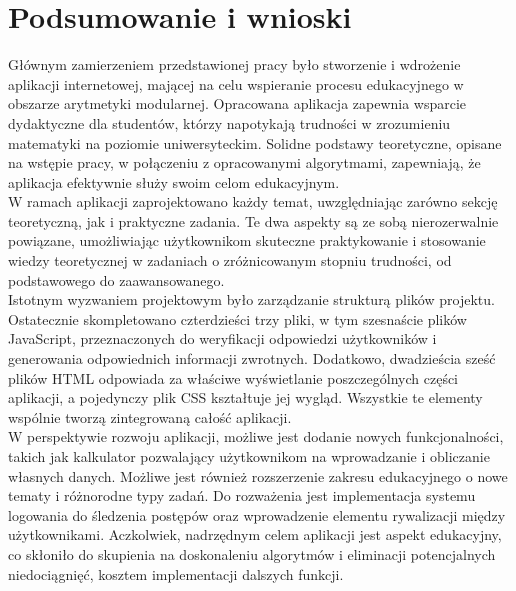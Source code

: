 \documentclass{SGGW-thesis}
\begin{document}
	\chapter{Podsumowanie i wnioski}
	Głównym zamierzeniem przedstawionej pracy było stworzenie i wdrożenie aplikacji internetowej, mającej na celu wspieranie procesu edukacyjnego w obszarze arytmetyki modularnej. Opracowana aplikacja zapewnia wsparcie dydaktyczne dla studentów, którzy napotykają trudności w zrozumieniu matematyki na poziomie uniwersyteckim. Solidne podstawy teoretyczne, opisane na wstępie pracy, w połączeniu z opracowanymi algorytmami, zapewniają, że aplikacja efektywnie służy swoim celom edukacyjnym.
	\\
	W ramach aplikacji zaprojektowano każdy temat, uwzględniając zarówno sekcję teoretyczną, jak i praktyczne zadania. Te dwa aspekty są ze sobą nierozerwalnie powiązane, umożliwiając użytkownikom skuteczne praktykowanie i stosowanie wiedzy teoretycznej w zadaniach o zróżnicowanym stopniu trudności, od podstawowego do zaawansowanego.
	\\
	Istotnym wyzwaniem projektowym było zarządzanie strukturą plików projektu. Ostatecznie skompletowano czterdzieści trzy pliki, w tym szesnaście plików JavaScript, przeznaczonych do weryfikacji odpowiedzi użytkowników i generowania odpowiednich informacji zwrotnych. Dodatkowo, dwadzieścia sześć plików HTML odpowiada za właściwe wyświetlanie poszczególnych części aplikacji, a pojedynczy plik CSS kształtuje jej wygląd. Wszystkie te elementy wspólnie tworzą zintegrowaną całość aplikacji.
	\\
	W perspektywie rozwoju aplikacji, możliwe jest dodanie nowych funkcjonalności, takich jak kalkulator pozwalający użytkownikom na wprowadzanie i obliczanie własnych danych. Możliwe jest również rozszerzenie zakresu edukacyjnego o nowe tematy i różnorodne typy zadań. Do rozważenia jest implementacja systemu logowania do śledzenia postępów oraz wprowadzenie elementu rywalizacji między użytkownikami. Aczkolwiek, nadrzędnym celem aplikacji jest aspekt edukacyjny, co skłoniło do skupienia na doskonaleniu algorytmów i eliminacji potencjalnych niedociągnięć, kosztem implementacji dalszych funkcji.
	
\end{document}
